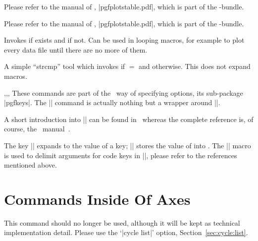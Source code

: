 \begin{command}{\pgfplotstableread{}}
	Please refer to the manual of \PGFPlotstable, |pgfplotstable.pdf|, which is part of the \PGFPlots-bundle.
\end{command}
\begin{command}{\pgfplotstabletypeset{}}
	Please refer to the manual of \PGFPlotstable, |pgfplotstable.pdf|, which is part of the \PGFPlots-bundle.
\end{command}

\begin{command}{\pgfplotsiffileexists{}}
	Invokes  if  exists and  if not. Can be used in looping macros, for example to plot every data file until there are no more of them.
\end{command}
\begin{command}{\pgfplotsutilifstringequal{}}
	A simple ``strcmp'' tool which invokes  if  $=$ and  otherwise. This does not expand macros.
\end{command}


\begin{commandlist}{\pgfkeys,\pgfeov,\pgfkeysvalueof,\pgfkeysgetvalue}
	These commands are part of the \Tikz\ way of specifying options, its sub-package |pgfkeys|. The |\pgfplotsset| command is actually nothing but a wrapper around |\pgfkeys|.

	A short introduction into |\pgfkeys| can be found in~\cite{keyvalintro} whereas the complete reference is, of course, the \Tikz\ manual~\cite{tikz}.

	The key |\pgfkeysvalueof| expands to the value of a key; |\pgfkeysgetvalue| stores the value of  into . The |\pgfeov| macro is used to delimit arguments for code keys in |\pgfkeys|, please refer to the references mentioned above.
\end{commandlist}

\section[Commands Inside Of PGFPlots Axes]{Commands Inside Of {\normalfont\PGFPlots} Axes}
\begin{command}{\autoplotspeclist}
This command should no longer be used, although it will be kept as technical implementation detail. Please use the `|cycle list|' option, Section~\ref{sec:cycle:list}.
\end{command}

